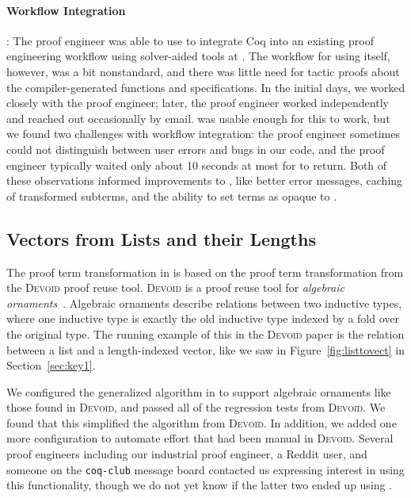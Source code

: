 \paragraph{Workflow Integration}:
The proof engineer was able to use \toolname to integrate Coq into an existing proof engineering
workflow using solver-aided tools at \company.
The workflow for using \toolname itself, however, was a bit nonstandard,
and there was little need for tactic proofs about the compiler-generated functions and specifications.
In the initial days, we worked closely with the proof engineer;
later, the proof engineer worked independently and reached out occasionally by email.
\toolname was usable enough for this to work, but we found two challenges with workflow integration:
the proof engineer sometimes could not distinguish between user errors and bugs in our code,
and the proof engineer typically waited only about 10 seconds at most for \toolname to return.
Both of these observations informed improvements to \toolname, like better error messages, caching of transformed subterms,
and the ability to set terms as opaque to \toolname.

\subsection{Vectors from Lists and their Lengths}
\label{sec:dep}

The proof term transformation in \toolname is based on the proof term transformation from
the \textsc{Devoid} proof reuse tool.
\textsc{Devoid} is a proof reuse tool for \textit{algebraic ornaments}~\cite{mcbride}. Algebraic ornaments describe relations
between two inductive types, where one inductive type is exactly the old inductive type indexed by a fold
over the original type.
The running example of this in the \textsc{Devoid} paper is the relation between a list and a
length-indexed vector, like we saw in Figure~\ref{fig:listtovect} in Section~\ref{sec:key1}.

We configured the generalized algorithm in \toolname to support algebraic ornaments like those found in \textsc{Devoid},
and passed all of the regression tests from \textsc{Devoid}.
We found that this simplified the algorithm from \textsc{Devoid}.
In addition, we added one more configuration to automate effort that had been manual in \textsc{Devoid}.
Several proof engineers including our industrial proof engineer, a Reddit user,
and someone on the \lstinline{coq-club} message board contacted us expressing interest in using this functionality,
though we do not yet know if the latter two ended up using \toolname. %

